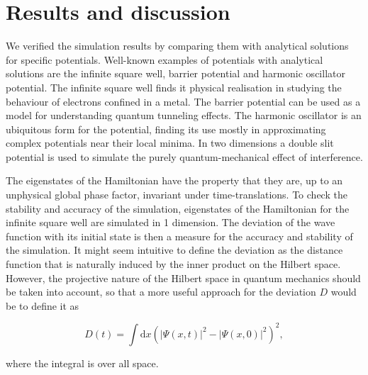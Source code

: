 \section{Results and discussion}
We verified the simulation results by comparing them with analytical solutions for specific potentials. Well-known examples of potentials with analytical solutions are the infinite square well, barrier potential and harmonic oscillator potential.
The infinite square well finds it physical realisation in studying the behaviour of electrons confined in a metal. The barrier potential can be used as a model for understanding quantum tunneling effects. The harmonic oscillator is an ubiquitous form for the potential, finding its use mostly in approximating complex potentials near their local minima.
In two dimensions a double slit potential is used to simulate the purely quantum-mechanical effect of interference.


The eigenstates of the Hamiltonian have the property that they are, up to an unphysical global phase factor, invariant under time-translations. To check the stability and accuracy of the simulation, eigenstates of the Hamiltonian for the infinite square well are simulated in 1 dimension. The deviation of the wave function with its initial state is then a measure for the accuracy and stability of the simulation. It might seem intuitive to define the deviation as the distance function that is naturally induced by the inner product on the Hilbert space. However, the projective nature of the Hilbert space in quantum mechanics should be taken into account, so that a more useful approach for the deviation $D$ would be to define it as

\[
D(t) = \int\mathrm{d}x\left(|\Psi(x,t)|^2-|\Psi(x,0)|^2\right)^2,
\]

where the integral is over all space. 

